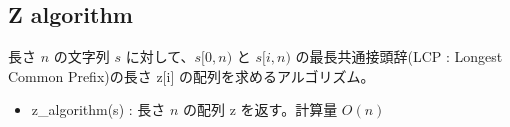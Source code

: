 \subsection{Z algorithm}

長さ $n$ の文字列 $s$ に対して、$s[0,n)$ と $s[i,n)$ の最長共通接頭辞(LCP : Longest Common Prefix)の長さ z[i] の配列を求めるアルゴリズム。

\begin{itemize}
    \item z\_algorithm(s) : 長さ $n$ の配列 z を返す。計算量 $O(n)$
\end{itemize}


